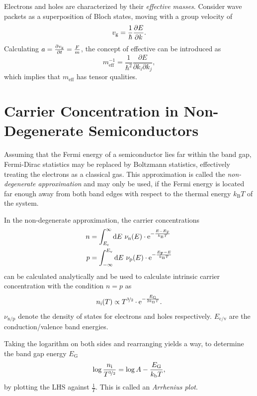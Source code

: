 Electrons and holes are characterized by their \textit{effective masses}.
Consider wave packets as a superposition of Bloch states, moving with a group velocity of
\begin{equation*}
	v_\text{g} = \frac{1}{\hbar}\frac{\partial E}{\partial k}.
\end{equation*}
Calculating $a=\frac{\partial v_\text{g}}{\partial t} = \frac{F}{m}$, the concept of effective can be introduced as
\begin{equation*}
	m_\text{eff}^{-1} = \frac{1}{\hbar^2}\frac{\partial E}{\partial k_i \partial k_j},
\end{equation*}
which implies that $m_\text{eff}$ has tensor qualities.

\section{Carrier Concentration in Non-Degenerate Semiconductors}\label{sec:cc}
Assuming that the Fermi energy of a semiconductor lies far within the band gap, Fermi-Dirac statistics may be replaced by Boltzmann statistics, effectively treating the electrons as a classical gas.
This approximation is called the \textit{non-degenerate approximation} and may only be used, if the Fermi energy is located far enough away from both band edges with respect to the thermal energy $k_\text{B}T$ of the system.

In the non-degenerate approximation, the carrier concentrations
\begin{align*}
	n &= \int_{E_\text{c}}^\infty\d E\ \nu_\text{n}(E)\cdot\e^{-\frac{E-E_\text{F}}{k_\text{B}T}} \\
	p &= \int_{-\infty}^{E_\text{v}}\d E\ \nu_\text{p}(E)\cdot\e^{-\frac{E_\text{F}-E}{k_\text{B}T}}
\end{align*}
can be calculated analytically and be used to calculate intrinsic carrier concentration with the condition $n=p$ as
\begin{equation*}
	n_\text{i}(T) \propto T^{\nicefrac{3}{2}}\cdot\mathrm{e}^{-\frac{E_\text{G}}{2k_\text{B}T}}.
\end{equation*}
$\nu_\text{n/p}$ denote the density of states for electrons and holes respectively. $E_\text{c/v}$ are the conduction/valence band energies.

Taking the logarithm on both sides and rearranging yields a way, to determine the band gap energy $E_\text{G}$
\begin{equation*}
	\log{\frac{n_\text{i}}{T^{\nicefrac{3}{2}}}} = \log{A} - \frac{E_\text{G}}{k_\text{b}T},
\end{equation*}
by plotting the LHS against $\frac{1}{T}$. This is called an \textit{Arrhenius plot}.

